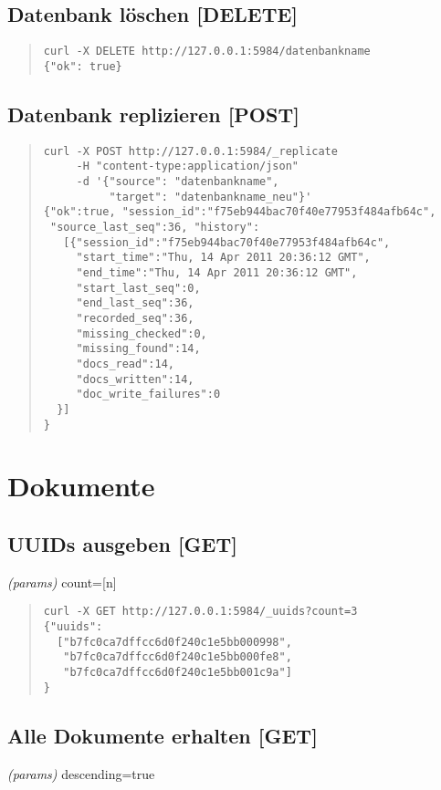 \documentclass[19pt,landscape,twocolumn]{article}
\newcommand{\htmlverb}[1]{{[}\textbf{{#1}}{]}}
\begin{document}
\subsection{Datenbank löschen \htmlverb{DELETE}}
\begin{quote}
\begin{verbatim}
curl -X DELETE http://127.0.0.1:5984/datenbankname
{"ok": true}
\end{verbatim}
\end{quote}

\subsection{Datenbank replizieren \htmlverb{POST}}
\begin{quote}
\begin{verbatim}
curl -X POST http://127.0.0.1:5984/_replicate 
     -H "content-type:application/json" 
     -d '{"source": "datenbankname", 
          "target": "datenbankname_neu"}'
{"ok":true, "session_id":"f75eb944bac70f40e77953f484afb64c", 
 "source_last_seq":36, "history":
   [{"session_id":"f75eb944bac70f40e77953f484afb64c",
     "start_time":"Thu, 14 Apr 2011 20:36:12 GMT", 
     "end_time":"Thu, 14 Apr 2011 20:36:12 GMT",
     "start_last_seq":0,
     "end_last_seq":36,
     "recorded_seq":36,
     "missing_checked":0,
     "missing_found":14,
     "docs_read":14,
     "docs_written":14,
     "doc_write_failures":0
  }]
}
\end{verbatim}
\end{quote}

\section{Dokumente}
\subsection{UUIDs ausgeben \htmlverb{GET}}
\emph{(params)} count={[}n{]}
\begin{quote}
\begin{verbatim}
curl -X GET http://127.0.0.1:5984/_uuids?count=3
{"uuids":
  ["b7fc0ca7dffcc6d0f240c1e5bb000998",
   "b7fc0ca7dffcc6d0f240c1e5bb000fe8",
   "b7fc0ca7dffcc6d0f240c1e5bb001c9a"]
}
\end{verbatim}
\end{quote}

\subsection{Alle Dokumente erhalten \htmlverb{GET}}
\emph{(params)} descending=true
\end{document}
